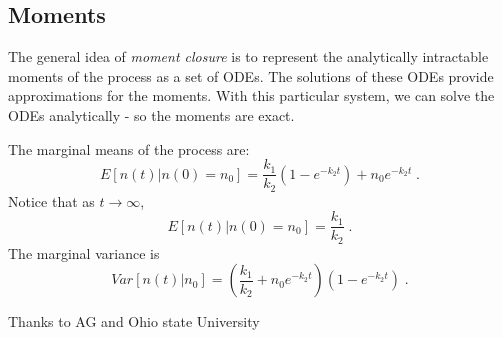 \documentclass{pnastwo}
\begin{document}
\begin{article}
\subsection{Moments}

The general idea of \textit{moment closure} is to represent the analytically intractable moments of the process as a set of ODEs. The solutions of these ODEs provide approximations for the moments. With this particular system, we can solve the ODEs analytically - so the moments are exact.

The marginal means of the process are:
\[
E[n(t) | n(0) = n_0 ] = \frac{k_1}{k_2}(1-e^{-k_2 t}) + n_0 e^{-k_2 t} \;.
\]
Notice that as $t \rightarrow \infty$,
\[
E[n(t) | n(0) = n_0 ] = \frac{k_1}{k_2} \;.
\]
The marginal variance is
\[
Var[n(t) | n_0]  = \left(\frac{k_1}{k_2} + n_0e^{-k_2 t}\right)(1-e^{-k_2 t}) \;.
\]

\begin{acknowledgments}
Thanks to AG and Ohio state University
\end{acknowledgments}






% 

\end{article}
\end{document}
